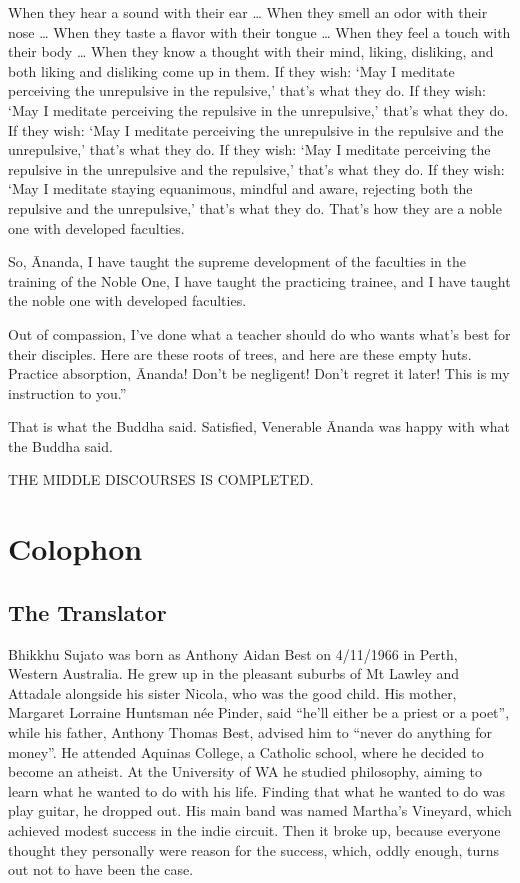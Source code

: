 \documentclass[12pt,openany]{book}%
\newcommand*{\scendbook}[1]{\begin{center}\uppercase{#1}\end{center}}
\let\oldbackmatter\backmatter
\renewcommand{\backmatter}{%
\chapterfont{\setstretch{.85}\normalfont\centering}%
\sectionfont{\setstretch{.85}\Semiboldsubheadfont}%
\oldbackmatter}
\begin{document}
When they hear a sound with their ear … When they smell an odor with their nose … When they taste a flavor with their tongue … When they feel a touch with their body … When they know a thought with their mind, liking, disliking, and both liking and disliking come up in them. If they wish: ‘May I meditate perceiving the unrepulsive in the repulsive,’ that’s what they do. If they wish: ‘May I meditate perceiving the repulsive in the unrepulsive,’ that’s what they do. If they wish: ‘May I meditate perceiving the unrepulsive in the repulsive and the unrepulsive,’ that’s what they do. If they wish: ‘May I meditate perceiving the repulsive in the unrepulsive and the repulsive,’ that’s what they do. If they wish: ‘May I meditate staying equanimous, mindful and aware, rejecting both the repulsive and the unrepulsive,’ that’s what they do. That’s how they are a noble one with developed faculties. 

So, Ānanda, I have taught the supreme development of the faculties in the training of the Noble One, I have taught the practicing trainee, and I have taught the noble one with developed faculties. 

Out of compassion, I’ve done what a teacher should do who wants what’s best for their disciples. Here are these roots of trees, and here are these empty huts. Practice absorption, Ānanda! Don’t be negligent! Don’t regret it later! This is my instruction to you.” 

That is what the Buddha said. Satisfied, Venerable Ānanda was happy with what the Buddha said. 

\scendbook{The Middle Discourses is completed. }

%
\backmatter%
\chapter*{Colophon}

\section*{The Translator}

Bhikkhu Sujato was born as Anthony Aidan Best on 4/11/1966 in Perth, Western Australia. He grew up in the pleasant suburbs of Mt Lawley and Attadale alongside his sister Nicola, who was the good child. His mother, Margaret Lorraine Huntsman née Pinder, said “he’ll either be a priest or a poet”, while his father, Anthony Thomas Best, advised him to “never do anything for money”. He attended Aquinas College, a Catholic school, where he decided to become an atheist. At the University of WA he studied philosophy, aiming to learn what he wanted to do with his life. Finding that what he wanted to do was play guitar, he dropped out. His main band was named Martha’s Vineyard, which achieved modest success in the indie circuit. Then it broke up, because everyone thought they personally were reason for the success, which, oddly enough, turns out not to have been the case. 
\end{document}
